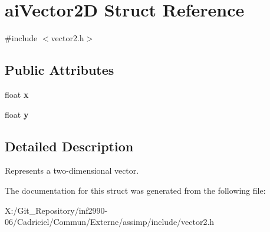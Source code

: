 \hypertarget{structai_vector2_d}{\section{ai\-Vector2\-D Struct Reference}
\label{structai_vector2_d}
}


{\ttfamily \#include $<$vector2.\-h$>$}

\subsection*{Public Attributes}
\begin{DoxyCompactItemize}
\item 
\hypertarget{structai_vector2_d_a968e4db235e054f58b4c320576d82740}{float {\bfseries x}}\label{structai_vector2_d_a968e4db235e054f58b4c320576d82740}

\item 
\hypertarget{structai_vector2_d_a7bb1686f941459496627a3b8ce68e73f}{float {\bfseries y}}\label{structai_vector2_d_a7bb1686f941459496627a3b8ce68e73f}

\end{DoxyCompactItemize}


\subsection{Detailed Description}
Represents a two-\/dimensional vector. 

The documentation for this struct was generated from the following file\-:\begin{DoxyCompactItemize}
\item 
X\-:/\-Git\-\_\-\-Repository/inf2990-\/06/\-Cadriciel/\-Commun/\-Externe/assimp/include/vector2.\-h\end{DoxyCompactItemize}
